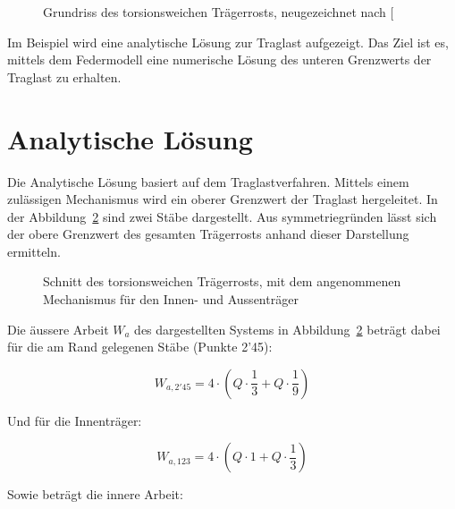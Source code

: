 \documentclass[
  11pt,
  letterpaper,
]{scrreprt}
\begin{document}
\begin{figure}[H]


\caption{\label{fig-trm_uebersicht}Grundriss des torsionsweichen
Trägerrosts, neugezeichnet nach
{[}\citeproc{ref-marti_baustatik_2014}{3}{]}}

\end{figure}%

Im Beispiel wird eine analytische Lösung zur Traglast aufgezeigt. Das
Ziel ist es, mittels dem Federmodell eine numerische Lösung des unteren
Grenzwerts der Traglast zu erhalten.

\section{Analytische Lösung}\label{analytische-luxf6sung}

Die Analytische Lösung basiert auf dem Traglastverfahren. Mittels einem
zulässigen Mechanismus wird ein oberer Grenzwert der Traglast
hergeleitet. In der Abbildung~\ref{fig-trm_schnitt} sind zwei Stäbe
dargestellt. Aus symmetriegründen lässt sich der obere Grenzwert des
gesamten Trägerrosts anhand dieser Darstellung ermitteln.

\begin{figure}[H]


\caption{\label{fig-trm_schnitt}Schnitt des torsionsweichen Trägerrosts,
mit dem angenommenen Mechanismus für den Innen- und Aussenträger}

\end{figure}%

Die äussere Arbeit \(W_a\) des dargestellten Systems in
Abbildung~\ref{fig-trm_schnitt} beträgt dabei für die am Rand gelegenen
Stäbe (Punkte 2'45):

\[
W_{a,2'45} = 4 \cdot \left( Q \cdot \frac{1}{3} + Q \cdot \frac{1}{9} \right)
\]

Und für die Innenträger:

\[
W_{a,123} = 4 \cdot \left( Q \cdot 1 + Q \cdot \frac{1}{3} \right)
\]

Sowie beträgt die innere Arbeit:
\end{document}
